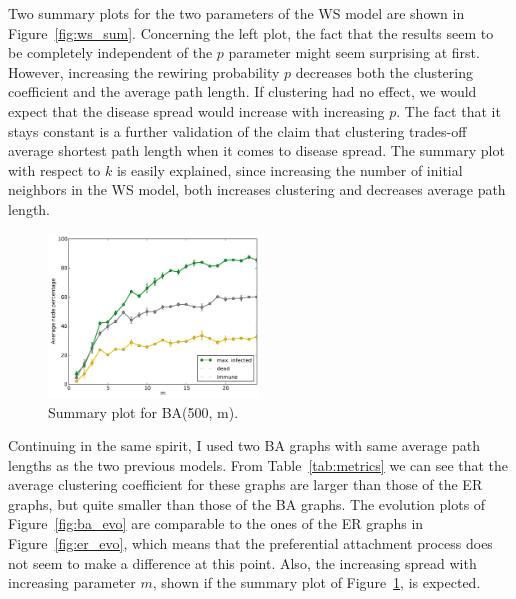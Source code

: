 \documentclass[11pt]{article} %
\begin{document}
Two summary plots for the two parameters of the WS model are shown in
Figure~\ref{fig:ws_sum}. Concerning the left plot, the fact that the
results seem to be completely independent of the $p$ parameter might
seem surprising at first.
However, increasing the rewiring probability $p$ decreases both the
clustering coefficient and the average path length. If clustering
had no effect, we would expect that the disease spread would increase
with increasing $p$. The fact that it stays constant is a further validation
of the claim that clustering trades-off average shortest path length
when it comes to disease spread. The summary plot with respect to $k$
is easily explained, since increasing the number of initial neighbors
in the WS model, both increases clustering and decreases average
path length.

\begin{figure}
  \centering
  \vspace{-5pt}
  \includegraphics[width=0.5\textwidth]{figures/sum_BA_500_m}
  \vspace{-17pt}
  \caption{Summary plot for BA(500, m).}
  \label{fig:ba_sum}
\end{figure}

Continuing in the same spirit, I used two BA graphs with same average
path lengths as the two previous models. From Table~\ref{tab:metrics}
we can see that the average clustering coefficient for these graphs
are larger than those of the ER graphs, but quite smaller than those
of the BA graphs. The evolution plots of Figure~\ref{fig:ba_evo}
are comparable to the ones of the ER graphs in Figure~\ref{fig:er_evo},
which means that the preferential attachment process does not seem
to make a difference at this point. Also, the increasing spread with
increasing parameter $m$, shown if the summary plot of
Figure~\ref{fig:ba_sum}, is expected.
\end{document}
